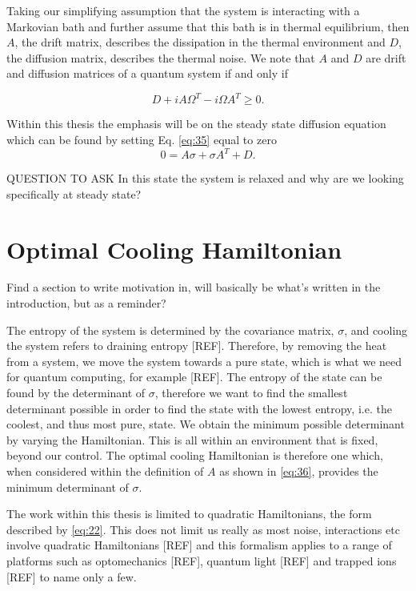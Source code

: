 \documentclass[11pt,a4paper]{article}
\numberwithin{equation}{section}
\begin{document}
	Taking our simplifying assumption that the system is interacting with a Markovian bath and further assume that this bath is in thermal equilibrium, then $A$, the drift matrix, describes the dissipation in the thermal environment and $D$, the diffusion matrix, describes the thermal noise. We note that $A$ and $D$ are drift and diffusion matrices of a quantum system if and only if \cite{Serafini17}
	
	\begin{equation} \label{eq:37}
	D + iA \Omega^T - i\Omega A^T \geq 0.
	\end{equation}
		
	Within this thesis the emphasis will be on the steady state diffusion equation which can be found by setting Eq. \ref{eq:35} equal to zero
	\begin{equation} \label{eq:38}
	0 = A\sigma +\sigma A^{T} + D.
	\end{equation}
	
	\color{blue}QUESTION TO ASK In this state the system is relaxed and why are we looking specifically at steady state? \color{black}
	
	\section{Optimal Cooling Hamiltonian}
	
	Find a section to write motivation in, will basically be what's written in the introduction, but as a reminder?
	
	The entropy of the system is determined by the covariance matrix, $\sigma$, and cooling the system refers to draining entropy [REF]. Therefore, by removing the heat from a system, we move the system towards a pure state, which is what we need for quantum computing, for example [REF]. The entropy of the state can be found by the determinant of $\sigma$, therefore we want to find the smallest determinant possible in order to find the state with the lowest entropy, i.e. the coolest, and thus most pure, state. We obtain the minimum possible determinant by varying the Hamiltonian. This is all within an environment that is fixed, beyond our control. The optimal cooling Hamiltonian is therefore one which, when considered within the definition of $A$ as shown in \ref{eq:36}, provides the minimum determinant of $\sigma$. 
	
	The work within this thesis is limited to quadratic Hamiltonians, the form described by \ref{eq:22}. This does not limit us really as most noise, interactions etc involve quadratic Hamiltonians [REF] and this formalism applies to a range of platforms such as optomechanics [REF], quantum light [REF] and trapped ions [REF] to name only a few. 
	
\end{document}
